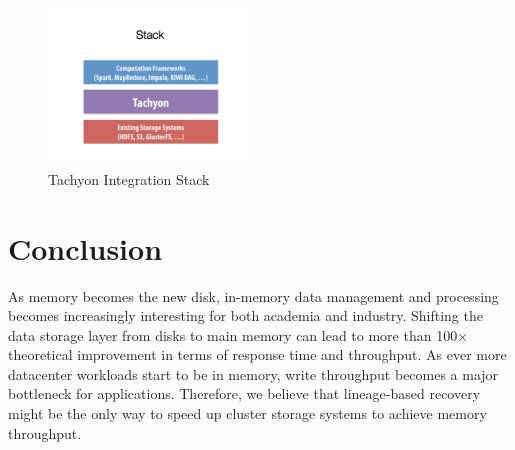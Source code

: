 \documentclass[twocolumn]{article}
\begin{document}
\begin{figure}[htb]
        \centering
        \includegraphics[width=0.48\textwidth]{stack.pdf}
        \caption{Tachyon Integration Stack}
        \label{fig:tachyon_stack}
\end{figure}

\section{Conclusion}
As memory becomes the new disk, in-memory data management and processing becomes increasingly interesting for both academia and industry.
Shifting the data storage layer from disks to main memory can lead to more than 100$\times$ theoretical improvement in terms of response time and throughput. 
As ever more datacenter workloads start to be in memory, write throughput becomes a major bottleneck for applications. Therefore, we believe that lineage-based recovery might be the only way to speed up cluster storage systems to achieve memory throughput.



\end{document}
